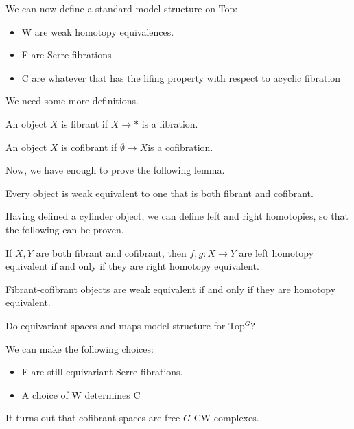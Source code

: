 \documentclass[11pt]{scrartcl}
\begin{document}
We can now define a standard model structure on Top:

\begin{itemize}
\item W are weak homotopy equivalences.
\item F are Serre fibrations
\item C are whatever that has the lifing property with respect to acyclic fibration
\end{itemize}

We need some more definitions.

\begin{definition}
  An object $X$ is fibrant if $ X \to *$ is a fibration.
\end{definition}

\begin{definition}
  An object $X$ is cofibrant if $\emptyset \to X$is a cofibration.
\end{definition}

Now, we have enough to prove the following lemma.

\begin{lemma}
Every object is weak equivalent to one that is both fibrant and cofibrant.
\end{lemma}

Having defined a cylinder object, we can define left and right
homotopies, so that the following can be proven.

\begin{theorem}
  If $X, Y$ are both fibrant and cofibrant, then $f, g: X\to Y$ are
  left homotopy equivalent if and only if they are right homotopy
  equivalent.
\end{theorem}

\begin{theorem}
Fibrant-cofibrant objects are weak equivalent if and only if they are homotopy equivalent.
\end{theorem}

Do equivariant spaces and maps model structure for Top$^G$?

We can make the following choices:

\begin{itemize}
\item F are still equivariant Serre fibrations.
\item A choice of W determines C
\end{itemize}

It turns out that cofibrant spaces are free $G$-CW complexes.
\end{document}
